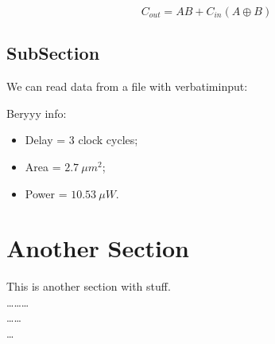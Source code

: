 \begin{equation}
C_{out} = AB + C_{in}( A \oplus B)
\label{eq:2}
\end{equation}
	
\subsection{SubSection}

We can read data from a file with verbatiminput:

  



Beryyy info:
\begin{itemize}
\item Delay = 3 clock cycles;
\item Area = $2.7\ \mu m^2$;
\item Power = $10.53\ \mu W$.
\end{itemize}
	
\section{Another Section}

This is another section with stuff.\\
\dots \dots \dots \\
\dots \dots \\
\dots